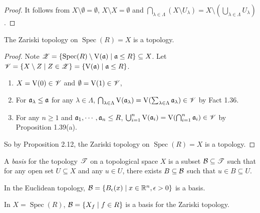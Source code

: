 \begin{proof}
    It follows from $X \setminus \emptyset = \emptyset$, $X \setminus X = \emptyset$ and $\bigcap_{\lambda \in \Lambda} (X \setminus U_\lambda) = X \setminus (\bigcup_{\lambda \in \Lambda} U_\lambda)$.
\end{proof}

\begin{theorem}
    The Zariski topology on $\operatorname{Spec}(R) = X$ is a topology.
\end{theorem}

\begin{proof}
    Note $\mathscr{Z} = \{\operatorname{Spec}(R) \setminus \operatorname{V}(\mathfrak{a}) \mid \mathfrak{a} \leq R\} \subseteq X$. Let $\mathscr{V} = \{X \setminus Z \mid Z \in \mathscr{Z}\} = \{\operatorname{V}(\mathfrak{a}) \mid \mathfrak{a} \leq R\}$.
    \begin{enumerate}
        \item $X = \operatorname{V}(0) \in \mathscr{V}$ and $\emptyset = \operatorname{V}(1) \in \mathscr{V}$,
        \item For $\mathfrak{a}_\lambda \leq \mathfrak{a}$ for any $\lambda \in \Lambda$, $\bigcap_{\lambda \in \Lambda} \operatorname{V}(\mathfrak{a}_\lambda) = \operatorname{V}(\sum_{\lambda \in \Lambda} \mathfrak{a}_\lambda) \in \mathscr{V}$ by Fact 1.36.
        \item For any $n \geq 1$ and $\mathfrak{a}_1,\cdots,\mathfrak{a}_n \leq R$, $\bigcup_{i=1}^n \operatorname{V}(\mathfrak{a}_i) = \operatorname{V}(\bigcap_{i=1}^n \mathfrak{a}_i) \in \mathscr{V}$ by Proposition 1.39(a). \qedhere
    \end{enumerate}
    So by Proposition 2.12, the Zariski topology on $\operatorname{Spec}(R) = X$ is a topology.
\end{proof}

\begin{definition}
    A \emph{basis} for the topology $\mathscr{T}$ on a topological space $X$ is a subset $\mathcal{B} \subseteq \mathscr{T}$ such that for any open set $U \subseteq X$ and any $u \in U$, there exists $B \subseteq \mathcal{B}$ such that $u \in B \subseteq U$.
\end{definition}

\begin{example}
    In the Euclidean topology, $\mathcal{B} = \{B_\epsilon(x) \mid x \in \mathbb{R}^n, \epsilon > 0\}$ is a basis.
\end{example}

\begin{theorem}
    In $X = \operatorname{Spec}(R)$, $\mathcal{B} = \{X_f \mid f \in R\}$ is a basis for the Zariski topology.
\end{theorem}

